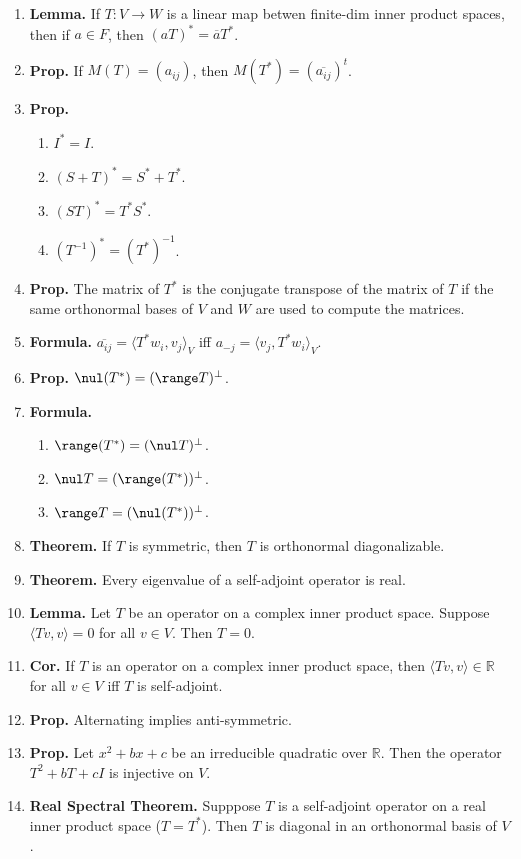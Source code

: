 \begin{enumerate}
	\item \textbf{Lemma. } If $T: V \to W$ is a linear map betwen finite-dim inner product spaces, then if $a \in F$, then $(aT)^* = \overline{a}T^*$. 
	\item \textbf{Prop. } If $M(T) = (a_{ij})$, then $M(T^*) = (\overline{a_{ij}})^t$. 
	\item \textbf{Prop. } 
	\begin{enumerate}
		\item $I^* = I$. 
		\item $(S+T)^* = S^* + T^*$. 
		\item $(ST)^* = T^*S^*$. 
		\item $(T^{-1})^* = (T^*)^{-1}$. 
	\end{enumerate}
	\item \textbf{Prop. } The matrix of $T^*$ is the conjugate transpose of the matrix of $T$ if the same orthonormal bases of $V$ and $W$ are used to compute the matrices. 
	\item \textbf{Formula. } $\overline{a_{ij}} = \langle T^*w_i, v_j \rangle_V$ iff $a_{-j} = \langle v_j, T^*w_i \rangle_V$. 
	\item \textbf{Prop. } $\nul (T^*) = (\range T)^\perp$. 
	\item \textbf{Formula. } 
	\begin{enumerate}
		\item $\range (T^*) = (\nul T)^\perp$. 
		\item $\nul T = (\range(T^*))^\perp$. 
		\item $\range T = (\nul(T^*))^\perp$. 
	\end{enumerate}
	\item \textbf{Theorem. } If $T$ is symmetric, then $T$ is orthonormal diagonalizable. 
	\item \textbf{Theorem. } Every eigenvalue of a self-adjoint operator is real. 
	\item \textbf{Lemma. } Let $T$ be an operator on a complex inner product space. Suppose $\langle Tv,v \rangle = 0$ for all $v \in V$. Then $T=0$. 
	\item \textbf{Cor. } If $T$ is an operator on a complex inner product space, then $\langle Tv,v \rangle \in \mathbb{R}$ for all $v \in V$ iff $T$ is self-adjoint. 
	\item \textbf{Prop. } Alternating implies anti-symmetric. 
	\item \textbf{Prop. } Let $x^2 + bx + c$ be an irreducible quadratic over $\mathbb{R}$. Then the operator $T^2 + bT + cI$ is injective on $V$. 
	\item \textbf{Real Spectral Theorem. } Supppose $T$ is a self-adjoint operator on a real inner product space ($T = T^*$). Then $T$ is diagonal in an orthonormal basis of $V$. 

\end{enumerate}
